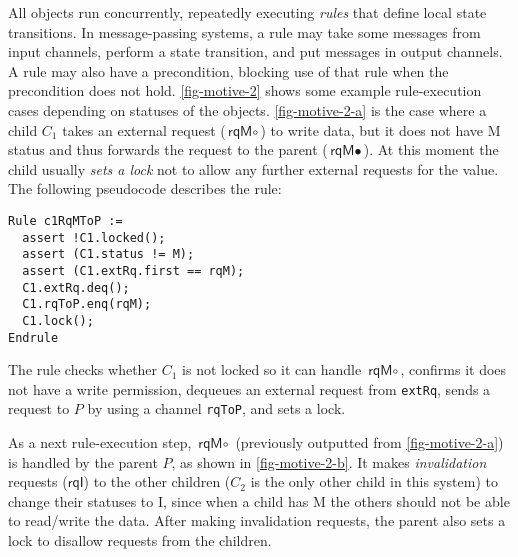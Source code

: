 \documentclass[sigplan,10pt,review,anonymous,screen]{acmart}\settopmatter{printfolios=true,printccs=false,printacmref=false}
\def\slstinline{\lstinline[basicstyle=\ttfamily\small]}
\begin{document}
All objects run concurrently, repeatedly executing \emph{rules} that define local state transitions.
In message-passing systems, a rule may take some messages from input channels, perform a state transition, and put messages in output channels.
A rule may also have a precondition, blocking use of that rule when the precondition does not hold.
\autoref{fig-motive-2} shows some example rule-execution cases depending on statuses of the objects.
\autoref{fig-motive-2-a} is the case where a child $C_1$ takes an external request ($\textsf{rqM}\circ$) to write data, but it does not have M status and thus forwards the request to the parent ($\textsf{rqM}\bullet$).
At this moment the child usually \emph{sets a lock} not to allow any further external requests for the value.
The following pseudocode describes the rule:
\begin{lstlisting}
Rule c1RqMToP :=
  assert !C1.locked();
  assert (C1.status != M);
  assert (C1.extRq.first == rqM);
  C1.extRq.deq();
  C1.rqToP.enq(rqM);
  C1.lock();
Endrule
\end{lstlisting}
The rule checks whether $C_1$ is not locked so it can handle $\textsf{rqM}\circ$, confirms it does not have a write permission, dequeues an external request from \slstinline{extRq}, sends a request to $P$ by using a channel \slstinline{rqToP}, and sets a lock.

As a next rule-execution step, $\textsf{rqM}\circ$ (previously outputted from \autoref{fig-motive-2-a}) is handled by the parent $P$, as shown in \autoref{fig-motive-2-b}.
It makes \emph{invalidation} requests ($\textsf{rqI}$) to the other children ($C_2$ is the only other child in this system) to change their statuses to I, since when a child has M the others should not be able to read/write the data.
After making invalidation requests, the parent also sets a lock to disallow requests from the children.
\end{document}
